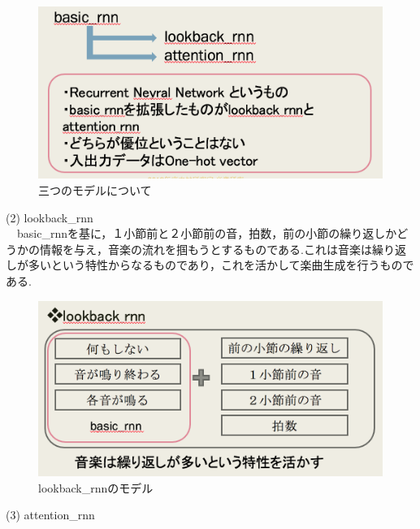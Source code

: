 \begin{figure}[!ht]
    \begin{screen}
    \begin{center}
        \includegraphics[scale=0.8,clip]{./img/basic1.png}
        \caption{三つのモデルについて}
        \label{fig:Melody_RNNについて}
    \end{center}
    \end{screen}
\end{figure}
\newpage
(2) lookback\_rnn\\
　basic\_rnnを基に，１小節前と２小節前の音，拍数，前の小節の繰り返しかどうかの情報を与え，音楽の流れを掴もうとするものである.これは音楽は繰り返しが多いという特性からなるものであり，これを活かして楽曲生成を行うものである.
\begin{figure}[!ht]
    \begin{screen}
    \begin{center}
        \includegraphics[scale=0.8,clip]{./img/lookback1.png}
        \caption{lookback\_rnnのモデル}
        \label{fig:lookback_rnnのモデル}
    \end{center}
    \end{screen}
\end{figure}
\newpage
(3) attention\_rnn\\
